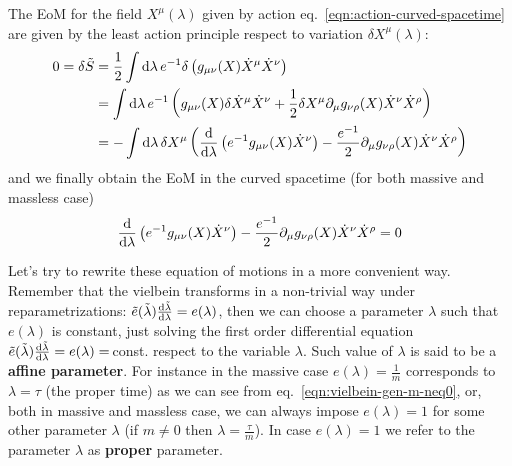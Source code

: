 \documentclass[../main/main.tex]{subfiles}
\begin{document}
The EoM for the field $X^\mu(\lambda)$ given by  action eq.~\eqref{eqn:action-curved-spacetime} are given by the least action principle respect to variation $\delta X^\mu(\lambda)$:
\begin{align*}
0=\delta\tilde S
&=\frac12\int\textup{d}\lambda\,e^{-1}\delta\left(g_{\mu\nu}(X)\dot X^\mu\dot X^\nu\right)\\
&=\int\textup{d}\lambda\,e^{-1}\left(g_{\mu\nu}(X)\delta\dot X^\mu\dot X^\nu+\frac12\delta X^\mu\partial_\mu g_{\nu\rho}(X)\dot X^\nu\dot X^\rho\right)\\
&=-\int\textup{d}\lambda\,\delta X^\mu \left(\frac{\textup{d}}{\textup{d}\lambda}\left(e^{-1}g_{\mu\nu}(X)\dot X^\nu\right)-\frac{e^{-1}}2\partial_\mu g_{\nu\rho}(X)\dot X^\nu\dot X^\rho\right)
\end{align*}
and we finally obtain the EoM in the curved spacetime (for both massive and massless case)
\begin{equation}
\frac{\textup{d}}{\textup{d}\lambda}\left(e^{-1}g_{\mu\nu}(X)\dot X^\nu\right)-\frac{e^{-1}}2\partial_\mu g_{\nu\rho}(X)\dot X^\nu\dot X^\rho=0
\end{equation}

Let's try to rewrite these equation of motions in a more convenient way. Remember that the vielbein transforms in a non-trivial way under reparametrizations: $\tilde e(\tilde \lambda)\frac{\textup{d}\tilde\lambda}{\textup{d}\lambda}=e(\lambda)$, then we can choose a parameter $\lambda$ such that $e(\lambda)$ is constant, just solving the first order differential equation $\tilde e(\tilde \lambda)\frac{\textup{d}\tilde\lambda}{\textup{d}\lambda}=e(\lambda)=\,$const. respect to the variable $\lambda$. Such value of $\lambda$ is said to be a \textbf{affine parameter}. For instance in the massive case $e(\lambda)=\frac1m$ corresponds to $\lambda=\tau$ (the proper time) as we can see from eq.~\eqref{eqn:vielbein-gen-m-neq0}, or, both in massive and massless case, we can always impose $e(\lambda)=1$ for some other parameter $\lambda$ (if $m\neq0$ then $\lambda=\frac\tau m$). In case $e(\lambda)=1$ we refer to the parameter $\lambda$ as \textbf{proper} parameter. 
\end{document}
